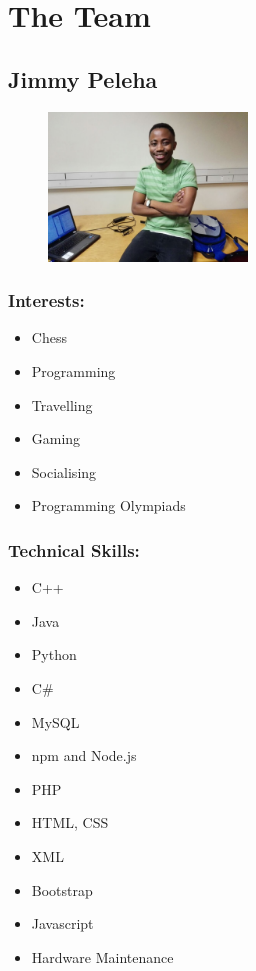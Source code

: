 \section{The Team}

\subsection{Jimmy Peleha}

\begin{figure}[t]
			\center
			\includegraphics[width=200px]{images/Jimmy.jpg}
\end{figure}

\subsubsection{Interests:}
\begin{itemize}
	\item Chess
	\item Programming
	\item Travelling
	\item Gaming
	\item Socialising
	\item Programming Olympiads
\end{itemize}

\subsubsection{Technical Skills:}
\begin{itemize}
	\item C++
	\item Java
	\item Python
	\item C\#
	\item MySQL
	\item npm and Node.js
	\item PHP
	\item HTML, CSS
	\item XML
	\item Bootstrap
	\item Javascript
	\item Hardware Maintenance 
\end{itemize}


